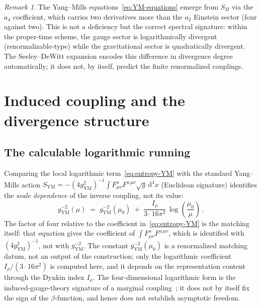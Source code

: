 \documentclass[12pt,a4paper]{article}
\theoremstyle{remark}
\newtheorem*{remark}{Remark}
\theoremstyle{plain}
\theoremstyle{definition}
\begin{document}
      \begin{remark}
        The Yang--Mills equations~\eqref{eq:YM-equations} emerge
        from $S_\Pi$ via the $a_4$ coefficient, which carries two
        derivatives more than the $a_2$ Einstein sector (four
        against two).
        This is not a deficiency but the correct spectral
        signature: within the proper-time scheme, the gauge sector is
        logarithmically divergent (renormalizable-type) while the
        gravitational sector is quadratically divergent.
        The Seeley--DeWitt expansion encodes this difference in
        divergence degree automatically; it does not, by itself,
        predict the finite renormalized couplings.
      \end{remark}

  \section{Induced coupling and the divergence structure}
    \label{sec:hierarchy}

    \subsection{The calculable logarithmic running}
      \label{subsec:induced-coupling}

      Comparing the local logarithmic term~\eqref{eq:entropy-YM} with
      the standard Yang--Mills action
      $S_{\mathrm{YM}} = -(4g_{\mathrm{YM}}^2)^{-1}
      \int F^a_{\mu\nu}F^{a\,\mu\nu}
      \sqrt{g}\,\mathrm{d}^4 x$ (Euclidean signature) identifies the
      \emph{scale dependence} of the inverse coupling, not its value:
      \begin{equation}\label{eq:induced-coupling}
        g_{\mathrm{YM}}^{-2}(\mu)
        \;=\;
        g_{\mathrm{YM}}^{-2}(\mu_0)
        \;+\;
        \frac{I_\rho}{3 \cdot 16\pi^2}\,
        \log\!\left(\frac{\mu_0}{\mu}\right)\,.
      \end{equation}
      The factor of four relative to the coefficient
      in~\eqref{eq:entropy-YM} is the matching itself: that equation gives the coefficient of
      $\int F^a_{\mu\nu}F^{a\,\mu\nu}$, which is identified with $(4g_{\mathrm{YM}}^2)^{-1}$,
      not with $g_{\mathrm{YM}}^{-2}$.
      The constant $g_{\mathrm{YM}}^{-2}(\mu_0)$ is a renormalized
      matching datum, not an output of the construction; only the
      logarithmic coefficient $I_\rho/(3\cdot16\pi^2)$ is computed
      here, and it depends on the representation content through the
      Dynkin index $I_\rho$.
      The four-dimensional logarithmic form is the induced-gauge-theory
      signature of a marginal coupling~\cite{Sakharov1968}; it does not
      by itself fix the sign of the $\beta$-function, and hence does
      not establish asymptotic freedom.
\end{document}
